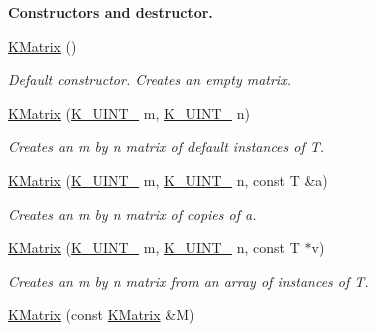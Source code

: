 \begin{Indent}\textbf{ Constructors and destructor.}\par
\begin{DoxyCompactItemize}
\item 
\mbox{\label{classKalman_1_1KMatrix_a07642df7b1f42df30a76dbc5c9242d8e}} 
\mbox{\hyperlink{classKalman_1_1KMatrix_a07642df7b1f42df30a76dbc5c9242d8e}{K\+Matrix}} ()
\begin{DoxyCompactList}\small\item\em Default constructor. Creates an empty matrix. \end{DoxyCompactList}\item 
\mbox{\hyperlink{classKalman_1_1KMatrix_aa8c4f382fc7b555f759b715a3f8bd4ae}{K\+Matrix}} (\mbox{\hyperlink{namespaceKalman_a628a50cae10f6e2035393d4f96c698bd}{K\+\_\+\+U\+I\+N\+T\+\_}} m, \mbox{\hyperlink{namespaceKalman_a628a50cae10f6e2035393d4f96c698bd}{K\+\_\+\+U\+I\+N\+T\+\_}} n)
\begin{DoxyCompactList}\small\item\em Creates an {\ttfamily m} by {\ttfamily n} matrix of default instances of {\ttfamily T}. \end{DoxyCompactList}\item 
\mbox{\hyperlink{classKalman_1_1KMatrix_aaebab9da4a4d9f27d318e6971c19dd07}{K\+Matrix}} (\mbox{\hyperlink{namespaceKalman_a628a50cae10f6e2035393d4f96c698bd}{K\+\_\+\+U\+I\+N\+T\+\_}} m, \mbox{\hyperlink{namespaceKalman_a628a50cae10f6e2035393d4f96c698bd}{K\+\_\+\+U\+I\+N\+T\+\_}} n, const T \&a)
\begin{DoxyCompactList}\small\item\em Creates an {\ttfamily m} by {\ttfamily n} matrix of copies of {\ttfamily a}. \end{DoxyCompactList}\item 
\mbox{\hyperlink{classKalman_1_1KMatrix_accade1f83577282512cf7b9aa2397837}{K\+Matrix}} (\mbox{\hyperlink{namespaceKalman_a628a50cae10f6e2035393d4f96c698bd}{K\+\_\+\+U\+I\+N\+T\+\_}} m, \mbox{\hyperlink{namespaceKalman_a628a50cae10f6e2035393d4f96c698bd}{K\+\_\+\+U\+I\+N\+T\+\_}} n, const T $\ast$v)
\begin{DoxyCompactList}\small\item\em Creates an {\ttfamily m} by {\ttfamily n} matrix from an array of instances of {\ttfamily T}. \end{DoxyCompactList}\item 
\mbox{\hyperlink{classKalman_1_1KMatrix_a2e14311ccbdfb3b4ee9edce0b14ecce3}{K\+Matrix}} (const \mbox{\hyperlink{classKalman_1_1KMatrix}{K\+Matrix}} \&M)

\end{DoxyCompactItemize}
\end{Indent}
